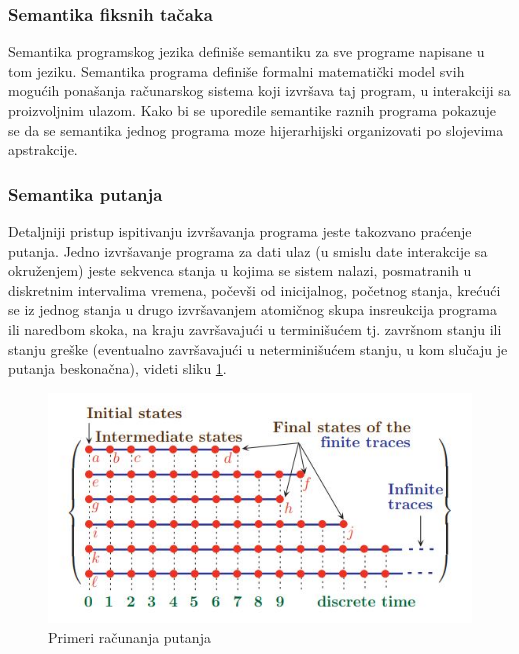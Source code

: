 \documentclass[a4paper]{article}
\begin{document}
\subsubsection{Semantika fiksnih tačaka}

Semantika programskog jezika definiše semantiku za sve programe napisane u tom jeziku. Semantika programa definiše formalni matematički model svih mogućih ponašanja računarskog sistema koji izvršava taj program, u interakciji sa proizvoljnim ulazom. Kako bi se uporedile semantike raznih programa pokazuje se da se semantika jednog programa moze hijerarhijski organizovati po slojevima apstrakcije.

\subsubsection{Semantika putanja}

Detaljniji pristup ispitivanju izvršavanja programa jeste takozvano praćenje putanja. Jedno izvršavanje programa za dati ulaz (u smislu date interakcije sa okruženjem) jeste sekvenca stanja u kojima se sistem nalazi, posmatranih u diskretnim intervalima vremena, počevši od inicijalnog, početnog stanja, krećući se iz jednog stanja u drugo izvršavanjem atomičnog skupa insreukcija programa ili naredbom skoka, na kraju završavajući u terminišućem tj. završnom stanju ili stanju greške (eventualno završavajući u neterminišućem stanju, u kom slučaju je putanja beskonačna), videti sliku \ref{fig:path}.
\begin{figure}[h!]
\begin{center}
\includegraphics[scale=0.7]{path.JPG}
\end{center}
\caption{Primeri računanja putanja}
\label{fig:path}
\end{figure} \newline
\end{document}
